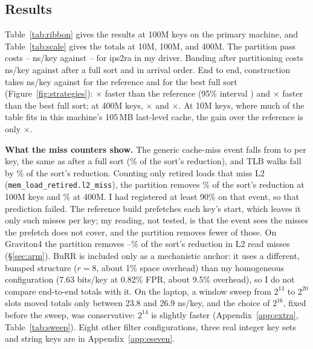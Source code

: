 \documentclass{article}
\begin{document}
\subsection{Results}
Table~\ref{tab:ribbon} gives the results at 100M keys on the primary machine, and Table~\ref{tab:scale} gives the totals at 10M, 100M, and 400M. The partition pass costs \esevenpartreordercent--\esevenpartreorderfour{} ns/key against \esevenipsreorderfour--\esevenipsreordercent{} for ips2ra in my driver. Banding after partitioning costs \esevenbandpart{} ns/key against \esevenbandsort{} after a full sort and \esevenbandref{} in arrival order. End to end, construction takes \esevenparttotalcent{} ns/key against \esevenreftotalcent{} for the reference and \esevensorttotalcent{} for the best full sort (Figure~\ref{fig:strategies}): \esevenrefpartcent$\times$ faster than the reference (95\% interval \esevenrefpartcentci) and \esevensortpartcent$\times$ faster than the best full sort; at 400M keys, \esevenrefpartfour$\times$ and \esevensortpartfour$\times$. At 10M keys, where much of the table fits in this machine's 105\,MB last-level cache, the gain over the reference is only \esevenrefparttenm$\times$.

\textbf{What the miss counters show.} The generic cache-miss event falls from \esevengenericref{} to \esevengenericpart{} per key, the same as after a full sort (\esevenrecgenericcent\% of the sort's reduction), and TLB walks fall by \esevenrectlbcent\% of the sort's reduction. Counting only retired loads that miss L2 (\texttt{mem\_load\_retired.l2\_miss}), the partition removes \esevenrecltwocent\% of the sort's reduction at 100M keys and \esevenrecltwofour\% at 400M. I had registered at least 90\% on that event, so that prediction failed. The reference build prefetches each key's start, which leaves it only \esevenltworef{} such misses per key; my reading, not tested, is that the event sees the misses the prefetch does not cover, and the partition removes fewer of those. On Graviton4 the partition removes \esevenarmreccent--\esevenarmrecfour\% of the sort's reduction in L2 read misses (\S\ref{sec:arm}). BuRR is included only as a mechanistic anchor: it uses a different, bumped structure ($r=8$, about 1\% space overhead) than my homogeneous configuration (7.63 bits/key at 0.82\% FPR, about 9.5\% overhead), so I do not compare end-to-end totals with it. On the laptop, a window sweep from $2^{13}$ to $2^{20}$ slots moved totals only between 23.8 and 26.9 ns/key, and the choice of $2^{16}$, fixed before the sweep, was conservative: $2^{14}$ is slightly faster (Appendix~\ref{app:extra}, Table~\ref{tab:sweep}). Eight other filter configurations, three real integer key sets and string keys are in Appendix~\ref{app:eseven}.
\end{document}
